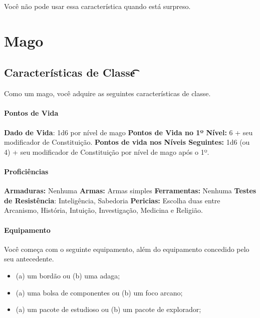 \documentclass{RPG_Adventure}[2021/10/20]
\begin{document}
Você não pode usar essa característica quando está surpreso.


\chapter{Mago}%
\label{cha:mago}

\section*{Características de Classe\t\t}%
\label{sec:caracteristicas_de_classe}

Como um mago, você adquire as seguintes características de classe.

\subsubsection{Pontos de Vida}%
\label{ssub:pontos_de_vida}

\textbf{Dado de Vida}: 1d6 por nível de mago \nl
\textbf{Pontos de Vida no 1º Nível:} 6 + seu modificador de Constituição. \nl
\textbf{Pontos de vida nos Níveis Seguintes:} 1d6 (ou 4) + seu modificador de
Constituição por nível de mago após o 1º.

\subsubsection{Proficiências}%
\label{ssub:proficiencias}

\textbf{Armaduras:} Nenhuma \nl
\textbf{Armas:} Armas simples \nl
\textbf{Ferramentas:} Nenhuma \jump
\textbf{Testes de Resistência}: Inteligência, Sabedoria \nl
\textbf{Pericias:} Escolha duas entre Arcanismo, História, Intuição,
Investigação, Medicina e Religião.

\subsubsection{Equipamento}%
\label{ssub:equipamento}

Você começa com o seguinte equipamento, além do equipamento concedido pelo seu
antecedente.
\begin{itemize}
    \item (a) um bordão ou (b) uma adaga;
    \item (a) uma bolsa de componentes ou (b) um foco arcano;
    \item (a) um pacote de estudioso ou (b) um pacote de explorador;
\end{itemize}
\end{document}
